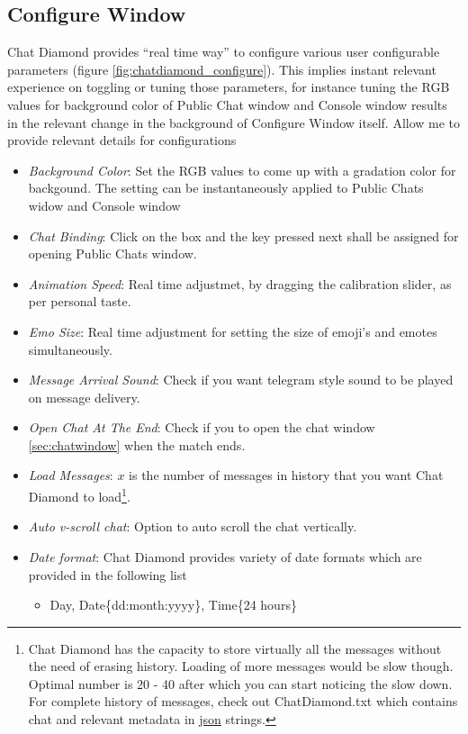 \documentclass{article}
\theoremstyle{definition}
\newcommand{\FileColor}[1]{{\color{Purple} #1}}
\begin{document}
\subsection{Configure Window}
Chat Diamond provides ``real time way'' to configure various user configurable parameters (figure \ref{fig:chatdiamond_configure}).  This implies instant relevant experience on toggling or tuning those parameters, for instance 
tuning the RGB values  for background color of Public Chat window and Console window results in the relevant change in the background of Configure Window itself.   Allow me to provide 
relevant details for configurations
\begin{itemize}
\item \emph{Background Color}: Set the RGB values to come up with a gradation color for backgound.  The setting can be instantaneously applied to Public Chats widow and Console window
\item \emph{Chat Binding}: Click on the box and the key pressed next shall be assigned for opening Public Chats window.
\item \emph{Animation Speed}: Real time adjustmet, by dragging the calibration slider, as per personal taste.
\item \emph{Emo Size}: Real time adjustment for setting the size of emoji's and emotes simultaneously.
\item \emph{Message Arrival Sound}: Check if you want telegram style sound to be played on message delivery.
\item \emph{Open Chat At The End}: Check if you to open the chat window \ref{sec:chatwindow} when the match ends.
\item \emph{Load Messages}: $x$ is the number of messages in history that you want Chat Diamond to load\footnote{Chat Diamond has the capacity to store virtually all the messages without the need of erasing history.  Loading of more messages would be slow though.  Optimal number is 20 - 40 after which you can start noticing the slow down.  For complete history of messages, check out \FileColor{ChatDiamond.txt} which contains chat and relevant metadata in \href{https://en.wikipedia.org/wiki/JSON}{json} strings.}.
\item \emph{Auto v-scroll chat}: Option to auto scroll the chat vertically.
\item \emph{Date format}: Chat Diamond provides variety of date formats which are provided in the following list
\begin{itemize}
\item Day, Date\{dd:month:yyyy\}, Time\{24 hours\}

\end{itemize}
\end{itemize}
\end{document}
